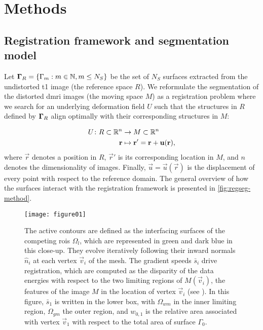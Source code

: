 \section{Methods}\label{sec:regseg-methods}

\subsection{Registration framework and segmentation model}\label{sec:regseg-methods_map}
Let $\boldsymbol{\Gamma}_R = \{\Gamma_m: m \in \mathbb{N}, m \leq N_S\}$ be the set of $N_S$ surfaces
  extracted from the undistorted \gls*{t1} image (the reference space $R$).
We reformulate the segmentation of the distorted \gls*{dmri} images (the moving space $M$)
  as a registration problem where we search for an underlying deformation field $U$ such that
  the structures in $R$ defined by $\boldsymbol{\Gamma}_R$ align optimally with their corresponding
  structures in $M$:

  \begin{align}
  U\colon R \subset \mathbb{R}^n &\to M \subset \mathbb{R}^n \notag\\
  \vec{r} &\mapsto \vec{r}' =\vec{r}+\vec{u}(\vec{r}),
  \label{eq:regseg-transform}
  \end{align}
  where $\vec{r}$ denotes a position in $R$, $\vec{r}'$ is
  its corresponding location in $M$, and $n$ denotes the dimensionality of images.
Finally, $\vec{u} = \vec{u}(\vec{r})$ is the displacement of every point with respect
  to the reference domain.
The general overview of how the surfaces interact with the registration framework
  is presented in \autoref{fig:regseg-method}.

\begin{figure}
  \texttt{[image: figure01]}
  \caption{The active contours are defined as the interfacing surfaces of the competing
    \glspl{roi} $\Omega_l$, which
  are represented in green and dark blue in this close-up.
  They evolve iteratively following their inward normals $\hat{n}_i$ at each vertex
    $\vec{v}_i$ of the mesh.
  The gradient speeds $\bar{s}_i$ drive registration, which are computed as the disparity of the data
    energies with respect to the two limiting regions of $M(\vec{v}_i)$, the features of the image
    $M$ in the location of vertex $\vec{v}_i$ (see ).
  In this figure, $\bar{s}_1$ is written in the lower
    box, with $\Omega_{wm}$ in the inner limiting region, $\Omega_{gm}$ the outer region, and
    $w_{0,1}$ is the relative area associated with vertex $\vec{v}_1$ with respect to
    the total area of surface $\Gamma_0$.
      }\label{fig:regseg-method}
\end{figure}

